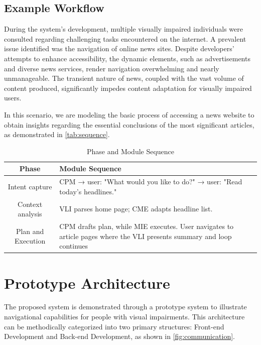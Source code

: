 \documentclass[conference]{IEEEtran}
\begin{document}
\subsection*{Example Workflow}

During the system's development, multiple visually impaired individuals were consulted regarding challenging tasks encountered on the internet. A prevalent issue identified was the navigation of online news sites. Despite developers' attempts to enhance accessibility, the dynamic elements, such as advertisements and diverse news services, render navigation overwhelming and nearly unmanageable. The transient nature of news, coupled with the vast volume of content produced, significantly impedes content adaptation for visually impaired users. 

In this scenario, we are modeling the basic process of accessing a news website to obtain insights regarding the essential conclusions of the most significant articles, as demonstrated in \autoref{tab:sequence}.

\vfill
\begin{table}[h]
\centering
\caption{Phase and Module Sequence}
\label{tab:sequence}
\footnotesize
\renewcommand{\arraystretch}{2}
\begin{tabular}{|c|p{5.5cm}|}
\hline
\textbf{Phase} & \textbf{Module Sequence} \\
\hline
Intent capture & CPM → user: "What would you like to do?" → user: "Read today's headlines." \\
\hline
Context analysis & VLI parses home page; CME adapts headline list. \\
\hline
Plan and Execution & CPM drafts plan, while MIE executes. User navigates to article pages where the VLI presents summary and loop continues\\
\hline
\end{tabular}
\vspace{0.5cm}
\end{table}

\section{Prototype Architecture}\label{methodology}

The proposed system is demonstrated through a prototype system to illustrate navigational capabilities for people with visual impairments. This architecture can be methodically categorized into two primary structures: Front-end Development and Back-end Development, as shown in \autoref{fig:communication}.
\end{document}
